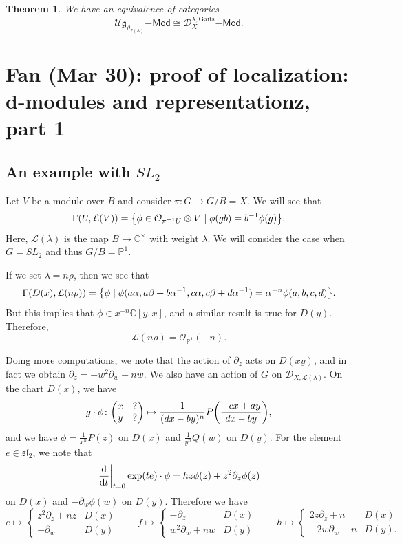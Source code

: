 \documentclass[leqno, openany]{memoir}
\newtheorem{thm}{Theorem}[section]
\theoremstyle{definition}
\theoremstyle{remark}
\theoremstyle{plain}
\theoremstyle{definition}
\theoremstyle{remark}
\newcommand{\C}{\mathbb{C}}
\renewcommand{\P}{\mathbb{P}}
\newcommand{\g}{\mathfrak{g}}
\newcommand{\mc}[1]{\mathcal{#1}}
\newcommand{\mf}[1]{\mathfrak{#1}}
\newcommand{\mr}[1]{\mathrm{#1}}
\newcommand{\ms}[1]{\mathsf{#1}}
\begin{document}
\begin{thm}
    We have an equivalence of categories 
    \[ \mc{U}\g_{\vartheta_{\tau(\lambda)}}\ms{-Mod} \cong \mc{D}_X^{\lambda, \mr{Gaits}}\ms{-Mod}. \]
\end{thm}

\chapter{Fan (Mar 30): proof of localization: d-modules and representationz, part 1}%

\section{An example with $SL_2$}

Let $V$ be a module over $B$ and consider $\pi \colon G \to G/B = X$. We will see that 
\[ \Gamma(U, \mc{L}(V)) = \qty{\phi \in \mc{O}_{\pi^{-1} U} \otimes V \mid \phi(gb) = b^{-1} \phi(g)}.  \]
Here, $\mc{L}(\lambda)$ is the map $B \to \C^{\times}$ with weight $\lambda$. We will consider the case when $G = SL_2$ and thus $G / B = \P^1$. 

If we set $\lambda = n \rho$, then we see that
\[ \Gamma(D(x), \mc{L}(n\rho)) = \qty{\phi \mid \phi(a\alpha, a\beta + b\alpha^{-1}, c\alpha, c\beta + d\alpha^{-1}) = \alpha^{-n} \phi(a,b,c,d)}. \]
But this implies that $\phi \in x^{-n} \C[y,x]$, and a similar result is true for $D(y)$. Therefore, 
\[ \mc{L}(n\rho) = \mc{O}_{\P^1}(-n). \]

Doing more computations, we note that the action of $\partial_z$ acts on $D(xy)$, and in fact we obtain $\partial_z = -w^2 \partial_w + nw$. We also have an action of $G$ on $\mc{D}_{X, \mc{L}(\lambda)}$. On the chart $D(x)$, we have
\[ g \cdot \phi \colon \mqty(x & ? \\ y & ?) \mapsto \frac{1}{(dx-by)^n} P\qty(\frac{-cx+ay}{dx-by}), \]
and we have $\phi = \frac{1}{x^n} P(z)$ on $D(x)$ and $\frac{1}{y^n} Q(w)$ on $D(y)$. For the element $e \in \mf{sl}_2$, we note that
\[ \eval{\dv{t}}_{t=0} \exp(t e) \cdot \phi = h z \phi(z) + z^2 \partial_z \phi(z) \]
on $D(x)$ and $-\partial_w \phi(w)$ on $D(y)$. Therefore we have
\[ e \mapsto \begin{cases}
    z^2 \partial_z + nz & D(x) \\
    -\partial_w & D(y)
\end{cases} \qquad f \mapsto \begin{cases}
    -\partial_z & D(x) \\
    w^2 \partial_w + nw & D(y)
\end{cases} \qquad h \mapsto \begin{cases}
    2z \partial_z + n & D(x) \\
    -2w \partial_w - n & D(y).
\end{cases}
\]
\end{document}
